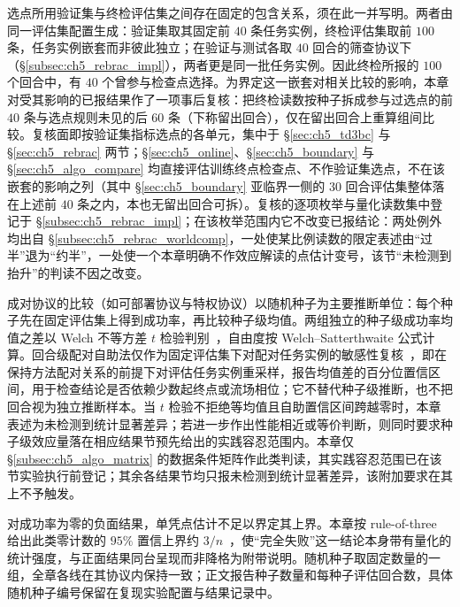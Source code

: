 选点所用验证集与终检评估集之间存在固定的包含关系，须在此一并写明。两者由同一评估集配置生成：验证集取其固定前 $40$ 条任务实例，终检评估集取前 $100$ 条，任务实例嵌套而非彼此独立；在验证与测试各取 $40$ 回合的筛查协议下（\S\ref{subsec:ch5_rebrac_impl}），两者更是同一批任务实例。因此终检所报的 $100$ 个回合中，有 $40$ 个曾参与检查点选择。为界定这一嵌套对相关比较的影响，本章对受其影响的已报结果作了一项事后复核：把终检读数按种子拆成参与过选点的前 $40$ 条与选点规则未见的后 $60$ 条（下称留出回合），仅在留出回合上重算组间比较。复核面即按验证集指标选点的各单元，集中于 \S\ref{sec:ch5_td3bc} 与 \S\ref{sec:ch5_rebrac} 两节；\S\ref{sec:ch5_online}、\S\ref{sec:ch5_boundary} 与 \S\ref{sec:ch5_algo_compare} 均直接评估训练终点检查点、不作验证集选点，不在该嵌套的影响之列（其中 \S\ref{sec:ch5_boundary} 亚临界一侧的 $30$ 回合评估集整体落在上述前 $40$ 条之内，本也无留出回合可拆）。复核的逐项枚举与量化读数集中登记于 \S\ref{subsec:ch5_rebrac_impl}；在该枚举范围内它不改变已报结论：两处例外均出自 \S\ref{subsec:ch5_rebrac_worldcomp}，一处使某比例读数的限定表述由“过半”退为“约半”，一处使一个本章明确不作效应解读的点估计变号，该节“未检测到抬升”的判读不因之改变。

成对协议的比较（如可部署协议与特权协议）以随机种子为主要推断单位：每个种子先在固定评估集上得到成功率，再比较种子级均值。两组独立的种子级成功率均值之差以 Welch 不等方差 $t$ 检验判别~\citep{welch1947ttest}，自由度按 Welch--Satterthwaite 公式计算。回合级配对自助法仅作为固定评估集下对配对任务实例的敏感性复核~\citep{efron1993bootstrap}，即在保持方法配对关系的前提下对评估任务实例重采样，报告均值差的百分位置信区间，用于检查结论是否依赖少数起终点或流场相位；它不替代种子级推断，也不把回合视为独立推断样本。当 $t$ 检验不拒绝等均值且自助置信区间跨越零时，本章表述为未检测到统计显著差异；若进一步作出性能相近或等价判断，则同时要求种子级效应量落在相应结果节预先给出的实践容忍范围内。本章仅 \S\ref{subsec:ch5_algo_matrix} 的数据条件矩阵作此类判读，其实践容忍范围已在该节实验执行前登记；其余各结果节均只报未检测到统计显著差异，该附加要求在其上不予触发。

对成功率为零的负面结果，单凭点估计不足以界定其上界。本章按 rule-of-three 给出此类零计数的 $95\%$ 置信上界约 $3/n$~\citep{jovanovic1997ruleofthree}，使“完全失败”这一结论本身带有量化的统计强度，与正面结果同台呈现而非降格为附带说明。随机种子取固定数量的一组，全章各线在其协议内保持一致；正文报告种子数量和每种子评估回合数，具体随机种子编号保留在复现实验配置与结果记录中。

